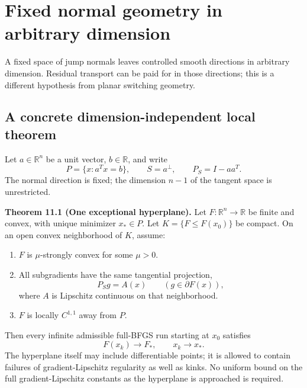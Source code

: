 \chapter{Fixed normal geometry in arbitrary dimension}\label{comp:U}\label{U:chapter}
\renewcommand{\ModuleTag}{11}
A fixed space of jump normals leaves controlled smooth directions in arbitrary dimension. Residual transport can be paid for in those directions; this is a different hypothesis from planar switching geometry.


\begingroup

\setcounter{section}{0}
\setcounter{theorem}{0}
\setcounter{lemma}{0}
\setcounter{corollary}{0}
\setcounter{proposition}{0}
\setcounter{remark}{0}
\setcounter{equation}{0}


\section{A concrete dimension-independent local
theorem}\label{U:a-concrete-dimension-independent-local-theorem}


Let \(a\in\mathbb R^n\) be a unit vector, \(b\in\mathbb R\), and write
\[
 P=\{x:a^Tx=b\},\qquad S=a^\perp,\qquad P_S=I-aa^T.
\] The normal direction is fixed; the dimension \(n-1\) of the tangent
space is unrestricted.

\label{U:one}\textbf{Theorem 11.1 (One exceptional hyperplane).} Let
\(F:\mathbb R^n\to\mathbb R\) be finite and convex, with unique
minimizer \(x_*\in P\). Let \(K=\{F\le F(x_0)\}\) be compact. On an open
convex neighborhood of \(K\), assume:

\begin{enumerate}
\def\labelenumi{\arabic{enumi}.}
\tightlist
\item
  \(F\) is \(\mu\)-strongly convex for some \(\mu>0\).
\item
  All subgradients have the same tangential projection,
  \[P_Sg=A(x)\qquad(g\in\partial F(x)),\] where \(A\) is Lipschitz
  continuous on that neighborhood.
\item
  \(F\) is locally \(C^{1,1}\) away from \(P\).
\end{enumerate}

Then every infinite admissible full-BFGS run starting at \(x_0\)
satisfies \[
 \boxed{F(x_k)\to F_*,\qquad x_k\to x_*.}
\] The hyperplane itself may include differentiable points; it is
allowed to contain failures of gradient-Lipschitz regularity as well as
kinks. No uniform bound on the full gradient-Lipschitz constants
as the hyperplane is approached is required.

